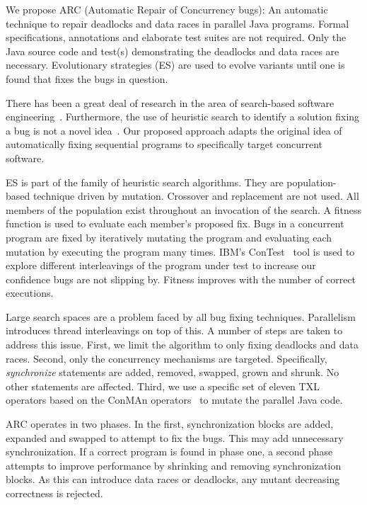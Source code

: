 \documentclass{llncs}
\begin{document}
We propose ARC (Automatic Repair of Concurrency bugs): An automatic technique
to repair deadlocks and data races in parallel Java programs. Formal
specifications, annotations and elaborate test suites are not required. Only
the Java source code and test(s) demonstrating the deadlocks and data races are
necessary. Evolutionary strategies (ES) are used to evolve variants until one
is found that fixes the bugs in question.

There has been a great deal of research in the area of search-based software
engineering~\cite{Har+10}. Furthermore, the use of heuristic search to identify
a solution fixing a bug is not a novel idea~\cite{FNWG09, AY08, Arc08, WT10,
WNLF09, WFGN10}. Our proposed approach adapts the original idea of
automatically fixing sequential programs to specifically target concurrent
software.

ES is part of the family of heuristic search algorithms. They are population-
based technique driven by mutation. Crossover and replacement are not used. All
members of the population exist throughout an invocation of the search. A
fitness function is used to evaluate each member's proposed fix. Bugs in a
concurrent program are fixed by iteratively mutating the program and evaluating
each mutation by executing the program many times. IBM's ConTest~\cite{EFN+02}
tool is used to explore different interleavings of the program under test to
increase our confidence bugs are not slipping by. Fitness improves with the
number of correct executions.

Large search spaces are a problem faced by all bug fixing techniques.
Parallelism introduces thread interleavings on top of this. A number of steps
are taken to address this issue. First, we limit the algorithm to only fixing
deadlocks and data races. Second, only the concurrency mechanisms are targeted.
Specifically, \textit{synchronize} statements are added, removed, swapped,
grown and shrunk. No other statements are affected. Third, we use a specific
set of eleven TXL~\cite{CHP91} operators based on the ConMAn
operators~\cite{BCD06} to mutate the parallel Java code.

ARC operates in two phases. In the first, synchronization blocks are added,
expanded and swapped to attempt to fix the bugs. This may add unnecessary
synchronization. If a correct program is found in phase one, a second phase
attempts to improve performance by shrinking and removing synchronization
blocks. As this can introduce data races or deadlocks, any mutant decreasing
correctness is rejected.
\end{document}
